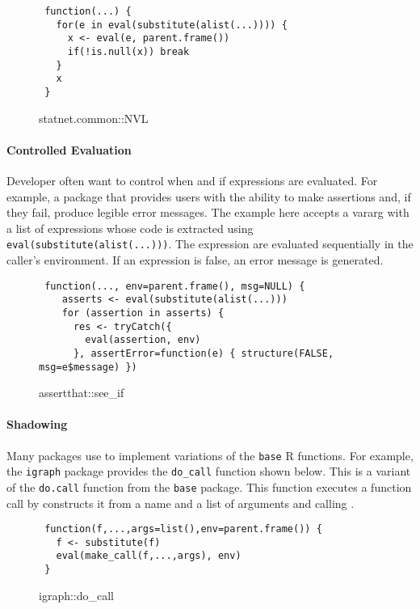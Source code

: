 \documentclass[screen,acmsmall]{acmart}%
\renewcommand{\k}[1]{\lstinline |#1|\xspace}
\begin{document}
\begin{figure}[h]
\begin{lstlisting}
 function(...) {
   for(e in eval(substitute(alist(...)))) {
     x <- eval(e, parent.frame())
     if(!is.null(x)) break
   }
   x
 }
\end{lstlisting}
  \caption{statnet.common::NVL}
\end{figure}


\paragraph{Controlled Evaluation}
Developer often want to control when and if expressions are evaluated. For
example, a package that provides users with the ability to make assertions and,
if they fail, produce legible error messages. The example here accepts a vararg
with a list of expressions whose code is extracted using
\k{eval(substitute(alist(...)))}. The expression are evaluated sequentially
in the caller's environment. If an expression is false, an error message is
generated.

\begin{figure}[h]
\begin{lstlisting}
 function(..., env=parent.frame(), msg=NULL) {
    asserts <- eval(substitute(alist(...)))
    for (assertion in asserts) {
      res <- tryCatch({
        eval(assertion, env)
      }, assertError=function(e) { structure(FALSE, msg=e$message) })
\end{lstlisting}
  \caption{assertthat::see\_if}
\end{figure}

\paragraph{Shadowing}
Many packages use \eval to implement variations of the \k{base} R functions.
For example, the \k{igraph} package provides the \k{do_call} function
shown below. This is a variant of the \k{do.call} function from the
\k{base} package. This function executes a function call by constructs it
from a name and a list of arguments and calling \eval.

\begin{figure}[h]
\begin{lstlisting}
 function(f,...,args=list(),env=parent.frame()) {
   f <- substitute(f)
   eval(make_call(f,...,args), env)
 }
\end{lstlisting}
\caption{igraph::do\_call}
\end{figure}
\end{document}

